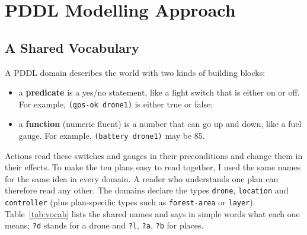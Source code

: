 \documentclass[11pt,a4paper,oneside]{report}
\newcommand{\code}[1]{\texttt{#1}}
\begin{document}
\chapter{PDDL Modelling Approach}\label{ch:model}

\section{A Shared Vocabulary}
A PDDL domain describes the world with two kinds of building blocks:
\begin{itemize}
  \item a \textbf{predicate} is a yes/no statement, like a light switch that is either on or off.
        For example, \code{(gps-ok drone1)} is either true or false;
  \item a \textbf{function} (numeric fluent) is a number that can go up and down, like a fuel
        gauge. For example, \code{(battery drone1)} may be 85.
\end{itemize}
Actions read these switches and gauges in their preconditions and change them in their effects.
To make the ten plans easy to read together, I used the same names for the same idea in every
domain. A reader who understands one plan can therefore read any other. The domains declare the
types \code{drone}, \code{location} and \code{controller} (plus plan-specific types such as
\code{forest-area} or \code{layer}). Table~\ref{tab:vocab} lists the shared names and says in
simple words what each one means; \code{?d} stands for a drone and \code{?l}, \code{?a},
\code{?b} for places.
\end{document}
